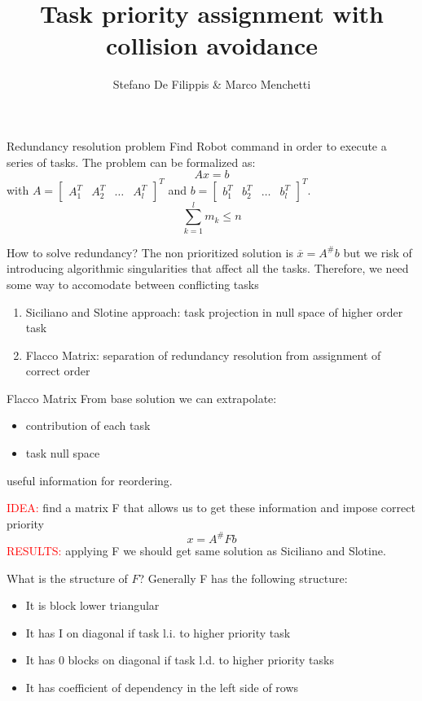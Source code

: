 \documentclass[11pt]{beamer}
\author[Stefano, Marco]{Stefano De Filippis \& Marco Menchetti}
\title[ROB2 project]{Task priority assignment with collision avoidance}
\institute[Sapienza]{Sapienza - University of Rome}
\date{}
\begin{document}
\begin{frame}
\titlepage
\end{frame}

\begin{frame}{Redundancy resolution problem}
Find Robot command in order to execute a series of tasks. The problem can be formalized as:
\[
Ax = b
\]
with $A = \begin{bmatrix}
A_1^T & A_2^T & \dots & A_l^T 
\end{bmatrix}^T$ and $
b = \begin{bmatrix}
b_1^T & b_2^T & \dots & b_l^T 
\end{bmatrix}^T
$.
\[
\sum_{k=1}^{l}m_k \leq n
\]
\end{frame}

\begin{frame}{How to solve redundancy?}
The non prioritized solution is $\overline{x} = A^{\#}b$ but we risk of introducing algorithmic singularities that affect all the tasks. Therefore, we need some way to accomodate between conflicting tasks
\begin{enumerate}
\item Siciliano and Slotine approach: task projection in null space of higher order task
\item Flacco Matrix: separation of redundancy resolution from assignment of correct order
\end{enumerate}
\end{frame}

\begin{frame}{Flacco Matrix}
From base solution we can extrapolate:
\begin{itemize}
\item contribution of each task
\item task null space
\end{itemize}
useful information for reordering.

\textcolor{red}{IDEA:} find a matrix F that allows us to get these information and impose correct priority
\[
x = A^{\#}Fb
\]
\textcolor{red}{RESULTS:} applying F we should get same solution as Siciliano and Slotine.
\end{frame}

\begin{frame}{What is the structure of $F$?}
Generally F has the following structure:
\begin{itemize}
\item It is block lower triangular
\item It has I on diagonal if task l.i. to higher priority task
\item It has 0 blocks on diagonal if task l.d. to higher priority tasks
\item It has coefficient of dependency in the left side of rows
\end{itemize}
\end{frame}
\end{document}
